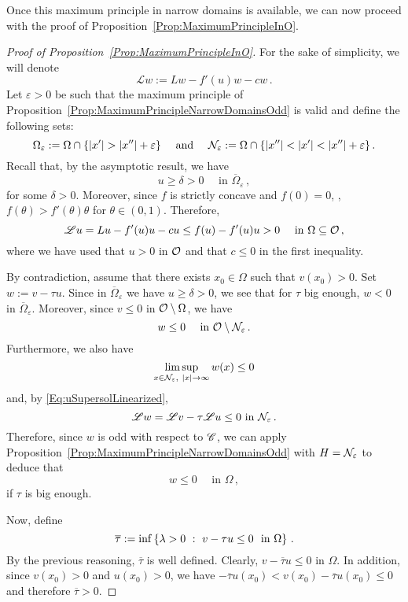 Once this maximum principle in narrow domains is available, we can now proceed with the proof of Proposition~\ref{Prop:MaximumPrincipleInO}.

\begin{proof}[Proof of Proposition~\ref{Prop:MaximumPrincipleInO}]
    


	For the sake of simplicity, we will denote 
	$$
	\mathscr{L} w := Lw - f'(u)w - cw\,.
	$$
	Let $\varepsilon > 0$ be such that the maximum principle of Proposition~\ref{Prop:MaximumPrincipleNarrowDomainsOdd} is valid and define the following sets:
	$$
	\Omega_\varepsilon := \Omega \cap \{|x'| > |x''| + \varepsilon\}\quad \textrm{ and } \quad 
	\mathcal{N}_\varepsilon := \Omega \cap \{|x''| < |x'| < |x''| + \varepsilon\}\,.
	$$
	Recall that, by the asymptotic result, we have 
	$$
	u \geq \delta > 0 \quad \textrm{ in } \overline{\Omega}_\varepsilon\,,
	$$
	for some $\delta >0$. Moreover, since $f$ is strictly concave and $f(0)=0$, , $f(\theta) > f'(\theta) \theta$ for $\theta \in (0,1)$. Therefore,
	\begin{equation}
	\label{Eq:uSupersolLinearized}
	\mathscr{L} u = Lu - f'(u)u - cu \leq f(u) - f'(u)u > 0 \quad \textrm{ in } \Omega \subseteq \mathcal{O}\,,
	\end{equation}
	where we have used that $u>0$ in $\mathcal{O}$ and that $c\leq 0$ in the first inequality.
	
    
    By contradiction, assume that there exists $x_0\in \Omega$ such that $v(x_0)> 0$.
	Set $w := v - \tau u$. Since in $\overline{\Omega}_\varepsilon$ we have $u \geq \delta > 0$, we see that for $\tau$ big enough, $w < 0$ in $\overline{\Omega}_\varepsilon$. Moreover, since $v\leq 0$ in $\mathcal{O}\setminus\Omega$, we have 
	$$
	w \leq 0 \quad \textrm{ in } \mathcal{O} \setminus \mathcal{N}_\varepsilon\,.
	$$
	Furthermore, we also have
	$$
	\limsup_{x\in \mathcal{N}_\varepsilon, \ |x|\to \infty} w(x) \leq 0
	$$
	and, by \eqref{Eq:uSupersolLinearized},
	$$
	\mathscr{L} w = \mathscr{L} v - \tau \mathscr{L} u \leq 0 \textrm{ in } \mathcal{N}_\varepsilon\,.
	$$
	Therefore, since $w$ is odd with respect to $\mathscr{C}$, we can apply Proposition~\ref{Prop:MaximumPrincipleNarrowDomainsOdd} with $H = \mathcal{N}_\varepsilon$ to deduce that
	$$
	w \leq 0 \quad \textrm{ in } \Omega\,,
	$$
	if $\tau$ is big enough.
	
	Now, define 
	$$
	\overline{\tau}:= \inf \left \{ \lambda > 0 \ : \ v - \tau u \leq 0 \ \textrm{ in } \Omega \right \}\,.
	$$
	By the previous reasoning, $\overline{\tau}$ is well defined. Clearly, $v - \overline{\tau} u \leq 0 $ in $\Omega$. In addition, since $v(x_0)>0$ and $u(x_0)>0$, we have $-\overline{\tau} u(x_0) < v(x_0) - \overline{\tau} u (x_0) \leq 0$ and therefore $\overline{\tau} > 0$.
	

\end{proof}
